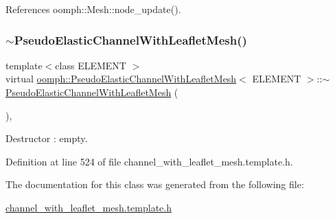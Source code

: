 References oomph\+::\+Mesh\+::node\+\_\+update().

\mbox{\label{classoomph_1_1PseudoElasticChannelWithLeafletMesh_aaf0a9484052254d5840b4cde85a10a75}} 
\subsubsection{\texorpdfstring{$\sim$\+Pseudo\+Elastic\+Channel\+With\+Leaflet\+Mesh()}{~PseudoElasticChannelWithLeafletMesh()}}
{\footnotesize\ttfamily template$<$class E\+L\+E\+M\+E\+NT $>$ \\
virtual \hyperlink{classoomph_1_1PseudoElasticChannelWithLeafletMesh}{oomph\+::\+Pseudo\+Elastic\+Channel\+With\+Leaflet\+Mesh}$<$ E\+L\+E\+M\+E\+NT $>$\+::$\sim$\hyperlink{classoomph_1_1PseudoElasticChannelWithLeafletMesh}{Pseudo\+Elastic\+Channel\+With\+Leaflet\+Mesh} (\begin{DoxyParamCaption}{ }\end{DoxyParamCaption})\hspace{0.3cm}{\ttfamily [inline]}, {\ttfamily [virtual]}}



Destructor \+: empty. 



Definition at line 524 of file channel\+\_\+with\+\_\+leaflet\+\_\+mesh.\+template.\+h.



The documentation for this class was generated from the following file\+:\begin{DoxyCompactItemize}
\item 
\hyperlink{channel__with__leaflet__mesh_8template_8h}{channel\+\_\+with\+\_\+leaflet\+\_\+mesh.\+template.\+h}\end{DoxyCompactItemize}
